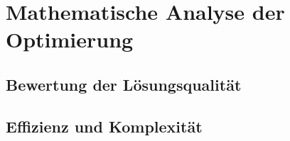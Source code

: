 \newpage
\section{Mathematische Analyse der Optimierung}
\subsection{Bewertung der Lösungsqualität}
\subsection{Effizienz und Komplexität}